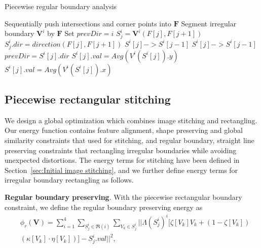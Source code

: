 \documentclass[10pt,journal,compsoc]{IEEEtran}
\begin{document}
\begin{algorithm}
 \label{alg:piecewise_analysis}
     \caption{Piecewise regular boundary analysis}
      Sequentially push intersections and corner points into $\mathbf{F}$\;
      Segment irregular boundary $\mathbf{V}^i$ by $\mathbf{F}$\;
      Set $prevDir=i$\;
      {
           $S^i_j=\mathbf{V}^i(F[j], F[j+1])$\;
           $S^i_j.dir=direction(F[j], F[j+1])$\;
      }
      {
         {
              $S^i[j] -> S^i[j-1]$\;
         }
         \Else
         {
               {
                     $S^i[j] -> S^i[j-1]$\;
               }
               \Else
               {
                    $prevDir = S^i[j].dir$\;
               }
          }
           {
                $S^i[j].val = Avg(V^i(S^i[j]).y)$\;
           }
           \Else
           {
                $S^i[j].val = Avg(V^i(S^i[j]).x)$\;
           }
      }
\end{algorithm}

\subsection{Piecewise rectangular stitching}
We design a global optimization which combines image stitching and rectangling.
Our energy function contains feature alignment, shape preserving and global similarity constraints that used for stitching,
and regular boundary, straight line preserving constraints that rectangling irregular boundaries while avoiding unexpected distortions.
The energy terms for stitching have been defined in Section~\ref{sec:Initial image stitching}, and we further define energy terms for irregular boundary rectangling as follows.

\textbf{Regular boundary preserving}.
With the piecewise rectangular boundary constraint, we define the regular boundary preserving energy as
\begin{equation} \label{equ:piecewise_boundary}
\begin{split}
   &\phi_r(\mathbf{V})=\sum\limits_{i=1}^4\sum\limits_{S^i_j \in \Re(i)}\sum\limits_{V_k \in S^i_j}|| \Lambda(S^i_j)^i[\zeta[V_k] V_k+(1-\zeta[V_k])\\
   &(\kappa[V_k] \cdot \eta[V_k])]-S^i_j.val ||^2,
\end{split}
\end{equation}
\end{document}
